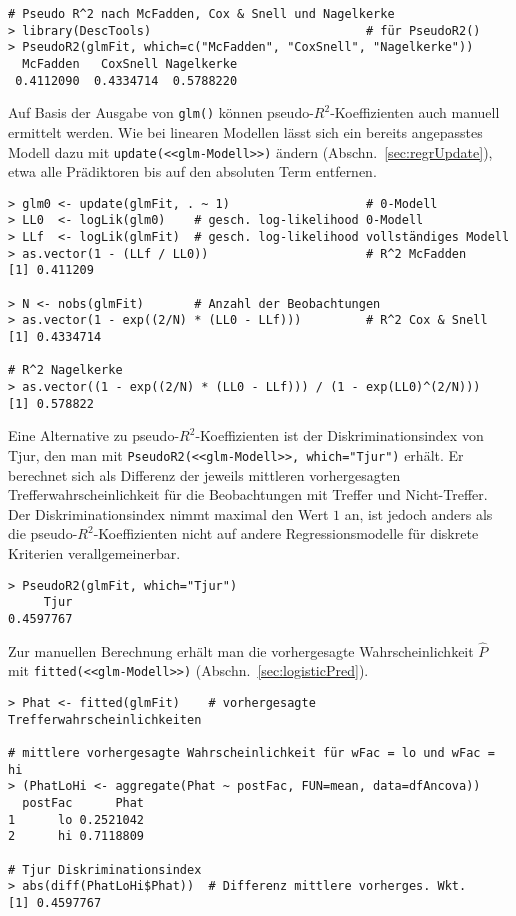 \begin{lstlisting}
# Pseudo R^2 nach McFadden, Cox & Snell und Nagelkerke
> library(DescTools)                              # für PseudoR2()
> PseudoR2(glmFit, which=c("McFadden", "CoxSnell", "Nagelkerke"))
  McFadden   CoxSnell Nagelkerke 
 0.4112090  0.4334714  0.5788220
\end{lstlisting}

Auf Basis der Ausgabe von \lstinline!glm()! können pseudo-$R^{2}$-Koeffizienten auch manuell ermittelt werden. Wie bei linearen Modellen lässt sich ein bereits angepasstes Modell dazu mit \lstinline!update(<<glm-Modell>>)! ändern (Abschn.\ \ref{sec:regrUpdate}), etwa alle Prädiktoren bis auf den absoluten Term entfernen.
\begin{lstlisting}
> glm0 <- update(glmFit, . ~ 1)                   # 0-Modell
> LL0  <- logLik(glm0)    # gesch. log-likelihood 0-Modell
> LLf  <- logLik(glmFit)  # gesch. log-likelihood vollständiges Modell
> as.vector(1 - (LLf / LL0))                      # R^2 McFadden
[1] 0.411209

> N <- nobs(glmFit)       # Anzahl der Beobachtungen
> as.vector(1 - exp((2/N) * (LL0 - LLf)))         # R^2 Cox & Snell
[1] 0.4334714

# R^2 Nagelkerke
> as.vector((1 - exp((2/N) * (LL0 - LLf))) / (1 - exp(LL0)^(2/N)))
[1] 0.578822
\end{lstlisting}

Eine Alternative zu pseudo-$R^{2}$-Koeffizienten ist der Diskriminationsindex von Tjur, den man mit \lstinline!PseudoR2(<<glm-Modell>>, which="Tjur")! erhält. Er berechnet sich als Differenz der jeweils mittleren vorhergesagten Trefferwahrscheinlichkeit für die Beobachtungen mit Treffer und Nicht-Treffer. Der Diskriminationsindex nimmt maximal den Wert $1$ an, ist jedoch anders als die pseudo-$R^{2}$-Koeffizienten nicht auf andere Regressionsmodelle für diskrete Kriterien verallgemeinerbar.
\begin{lstlisting}
> PseudoR2(glmFit, which="Tjur")
     Tjur
0.4597767
\end{lstlisting}

Zur manuellen Berechnung erhält man die vorhergesagte Wahrscheinlichkeit $\hat{P}$ mit  \lstinline!fitted(<<glm-Modell>>)! (Abschn.\ \ref{sec:logisticPred}).
\begin{lstlisting}
> Phat <- fitted(glmFit)    # vorhergesagte Trefferwahrscheinlichkeiten

# mittlere vorhergesagte Wahrscheinlichkeit für wFac = lo und wFac = hi
> (PhatLoHi <- aggregate(Phat ~ postFac, FUN=mean, data=dfAncova))
  postFac      Phat
1      lo 0.2521042
2      hi 0.7118809

# Tjur Diskriminationsindex
> abs(diff(PhatLoHi$Phat))  # Differenz mittlere vorherges. Wkt.
[1] 0.4597767
\end{lstlisting}

